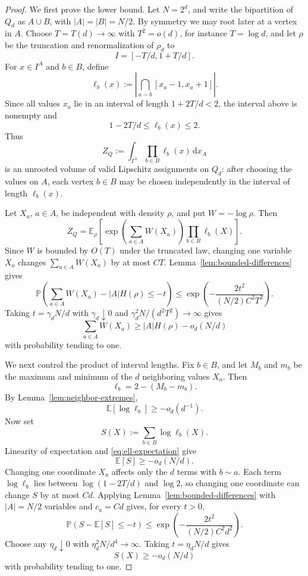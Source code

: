 \documentclass[11pt]{article}
\theoremstyle{definition}
\newcommand{\PP}{\mathbb{P}}
\newcommand{\EE}{\mathbb{E}}
\newcommand{\dd}{\,\mathrm{d}}
\begin{document}
\begin{proof}
We first prove the lower bound.  Let $N=2^d$, and write the bipartition of $Q_d$ as $A\cup B$, with $|A|=|B|=N/2$.  By symmetry we may root later at a vertex in $A$.  Choose $T=T(d)\to\infty$ with $T^2=o(d)$, for instance $T=\log d$, and let $\rho$ be the truncation and renormalization of $\rho_d$ to
\[
  I=[-T/d,1+T/d].
\]
For $x\in I^A$ and $b\in B$, define
\[
  \ell_b(x):=\left|\bigcap_{a\sim b}[x_a-1,x_a+1]\right|.
\]
Since all values $x_a$ lie in an interval of length $1+2T/d<2$, the interval above is nonempty and
\[
  1-2T/d\le \ell_b(x)\le 2.
\]
Thus
\[
  Z_Q:=\int_{I^A}\prod_{b\in B}\ell_b(x)\dd x_A
\]
is an unrooted volume of valid Lipschitz assignments on $Q_d$: after choosing the values on $A$, each vertex $b\in B$ may be chosen independently in the interval of length $\ell_b(x)$.

\bigskip
\noindent
Let $X_a$, $a\in A$, be independent with density $\rho$, and put $W=-\log\rho$.  Then
\[
  Z_Q=\EE_\rho\left[\exp\left(\sum_{a\in A}W(X_a)\right)
  \prod_{b\in B}\ell_b(X)\right].
\]
Since $W$ is bounded by $O(T)$ under the truncated law, changing one variable $X_a$ changes $\sum_{a\in A}W(X_a)$ by at most $CT$.  Lemma~\ref{lem:bounded-differences} gives
\[
  \PP\left(\sum_{a\in A}W(X_a)-|A|H(\rho)\le -t\right)
  \le \exp\left(-\frac{2t^2}{(N/2)C^2T^2}\right).
\]
Taking $t=\gamma_d N/d$ with $\gamma_d\downarrow0$ and $\gamma_d^2N/(d^2T^2)\to\infty$ gives
\begin{equation}\label{eq:Q-W-conc}
  \sum_{a\in A}W(X_a)
  \ge |A|H(\rho)-o_d(N/d)
\end{equation}
with probability tending to one.

\bigskip
\noindent
We next control the product of interval lengths.  Fix $b\in B$, and let $M_b$ and $m_b$ be the maximum and minimum of the $d$ neighboring values $X_a$.  Then
\[
  \ell_b=2-(M_b-m_b).
\]
By Lemma~\ref{lem:neighbor-extremes},
\begin{equation}\label{eq:ell-expectation}
  \EE\left[\log\ell_b\right]\ge -o_d(d^{-1}).
\end{equation}
Now set
\[
  S(X):=\sum_{b\in B}\log\ell_b(X).
\]
Linearity of expectation and \eqref{eq:ell-expectation} give
\[
  \EE \left[S\right]\ge -o_d(N/d).
\]
Changing one coordinate $X_a$ affects only the $d$ terms with $b\sim a$.  Each term $\log\ell_b$ lies between $\log(1-2T/d)$ and $\log 2$, so changing one coordinate can change $S$ by at most $C d$.  Applying Lemma~\ref{lem:bounded-differences} with $|A|=N/2$ variables and $c_a=Cd$ gives, for every $t>0$,
\[
  \PP(S-\EE \left[S\right]\le -t)
  \le \exp\left(-\frac{2t^2}{(N/2)C^2d^2}\right).
\]
Choose any $\eta_d\downarrow0$ with $\eta_d^2N/d^4\to\infty$.  Taking $t=\eta_d N/d$ gives
\begin{equation}\label{eq:Q-length-conc}
  S(X)\ge -o_d(N/d)
\end{equation}
with probability tending to one.


\end{proof}
\end{document}

